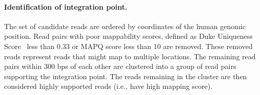 \documentclass{bioinfo}
\begin{document}
\paragraph{\textbf{Identification of integration point.}}  The set of candidate reads are ordered by coordinates of the human genomic position.  Read pairs with poor mappability scores, defined as Duke Uniqueness Score~\cite{unknown} less than 0.33 or MAPQ score less than 10 are removed.  These removed reads represent reads that might map to multiple locations.  The remaining read pairs within 300 bps of each other are clustered into a group of read pairs supporting the integration point.  The reads remaining in the cluster are then considered highly supported reads (i.e., have high mapping score).  



\end{document}
